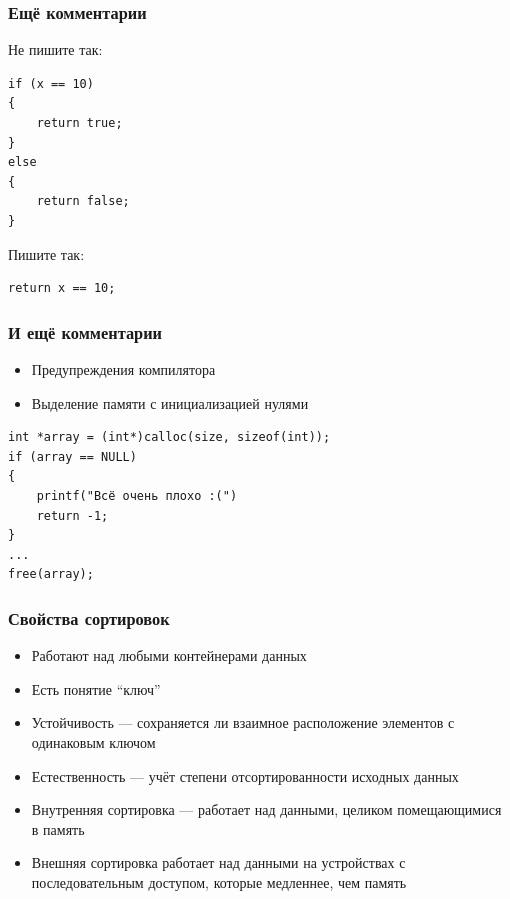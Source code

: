 \documentclass{../../slides-style}
\begin{document}
    \begin{frame}[fragile]
        \frametitle{Ещё комментарии}
        Не пишите так:
        \begin{verbatim}
if (x == 10) 
{
    return true;
}
else
{
    return false;
}
        \end{verbatim}
        Пишите так:
        \begin{verbatim}
return x == 10;
        \end{verbatim}
    \end{frame}

    \begin{frame}[fragile]
        \frametitle{И ещё комментарии}
        \begin{itemize}
            \item Предупреждения компилятора
            \item Выделение памяти с инициализацией нулями
        \end{itemize}
        \begin{verbatim}
int *array = (int*)calloc(size, sizeof(int));
if (array == NULL) 
{
    printf("Всё очень плохо :(")
    return -1;
}
...
free(array);
        \end{verbatim}
    \end{frame}
    
    \begin{frame}
        \frametitle{Свойства сортировок}
        \begin{itemize}
            \item Работают над любыми контейнерами данных
            \item Есть понятие ``ключ''
            \item Устойчивость --- сохраняется ли взаимное расположение элементов с одинаковым ключом
            \item Естественность --- учёт степени отсортированности исходных данных
            \item Внутренняя сортировка --- работает над данными, целиком помещающимися в память
            \item Внешняя сортировка работает над данными на устройствах с последовательным доступом, которые медленнее, чем память
        \end{itemize}
    \end{frame}
\end{document}
